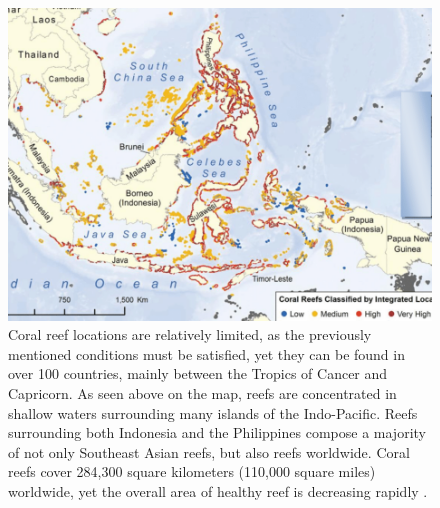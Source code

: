 \documentclass{book}\usepackage{knitr}
\begin{document}
\begin{knitrout}
\begin{kframe}
{\begin{figure}
\includegraphics[width=\linewidth]{images/reefmap}
\caption{Coral reef locations are relatively limited, as the previously mentioned conditions must be satisfied, yet they can be found in over 100 countries, mainly between the Tropics of Cancer and Capricorn. As seen above on the map, reefs are concentrated in shallow waters surrounding many islands of the Indo-Pacific. Reefs surrounding both Indonesia and the Philippines compose a majority of not only Southeast Asian reefs, but also reefs worldwide.   Coral reefs cover 284,300 square kilometers (110,000 square miles) worldwide, yet the overall area of healthy reef is decreasing rapidly \citep{Watlas}.}
\label{fig:Map of Southeast Asian Coral Reefs}
\end{figure}

}
\end{kframe}
\end{knitrout}
\end{document}
